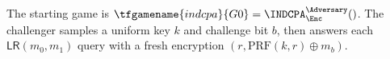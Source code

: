 The starting game is $\tfgamename{indcpa}{G0} = \INDCPA_\Enc^\Adversary()$.
The challenger samples a uniform key $k$ and challenge bit $b$, then
answers each $\mathsf{LR}(m_0, m_1)$ query with a fresh encryption
$(r, \mathrm{PRF}(k,r) \oplus m_b)$.
